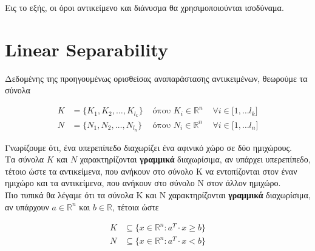 \documentclass[12pt]{article}
\newcommand{\R}{\mathbb{R}}
\newcommand{\margin}{\hspace{4pt}}
\begin{document}
Εις το εξής, οι όροι αντικείμενο και διάνυσμα θα χρησιμοποιούνται ισοδύναμα. \\

\pagebreak

\section{Linear Separability}

Δεδομένης της προηγουμένως ορισθείσας αναπαράστασης αντικειμένων, θεωρούμε τα σύνολα

\begin{align*}
    K & = \{K_{1}, K_{2}, \dotsc , K_{l_k}\} & \text{ όπου }  K_i \in \R^{n} & \margin \forall i \in \lbrack 1, \dotsc l_k \rbrack \\
    N & = \{N_{1}, N_{2}, \dotsc , N_{l_n}\} & \text{ όπου }  N_i \in \R^{n} & \margin \forall i \in \lbrack 1, \dotsc l_n \rbrack
\end{align*}

Γνωρίζουμε ότι, ένα υπερεπίπεδο διαχωρίζει ένα αφινικό χώρο σε δύο ημιχώρους. \\

Τα σύνολα \(K\) και \(N\) χαρακτηρίζονται \textbf{γραμμικά} διαχωρίσιμα,
αν υπάρχει υπερεπίπεδο, τέτοιο ώστε τα αντικείμενα,
που ανήκουν στο σύνολο Κ να εντοπίζονται στον έναν ημιχώρο και τα αντικείμενα,
που ανήκουν στο σύνολο N στον άλλον ημιχώρο. \\

Πιο τυπικά θα λέγαμε ότι τα σύνολα Κ και N χαρακτηρίζονται \textbf{γραμμικά} διαχωρίσιμα,
αν υπάρχουν \( a \in \R^{n} \) και \( b \in \R \), τέτοια ώστε

\begin{align*}
    K & \subseteq \{ x \in \R^{n} : a^{T} \cdot x \geq b \} \\
    N & \subseteq \{ x \in \R^{n} : a^{T} \cdot x < b\}
\end{align*}
\end{document}
